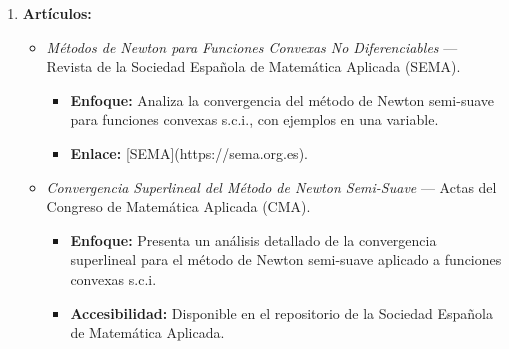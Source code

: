 \documentclass[12pt]{book}
\theoremstyle{definition}
\theoremstyle{plain}
\theoremstyle{remark}
\begin{document}
\begin{enumerate}
\begin{itemize}
        \item \textit{Curso de Optimización Convexa y No Diferenciable} — Universidad Nacional Autónoma de México (UNAM).
          \begin{itemize}
            \item \textbf{Contenido:} Aborda el método de Newton semi-suave para subdiferenciales, con ejemplos en \( \mathbb{R} \) y análisis de convergencia.
            \item \textbf{Enlace:} [IMUNAM - Optimización](https://www.matem.unam.mx).
          \end{itemize}

        \item \textit{Notas de Clase: Métodos de Optimización} — Universidad de Sevilla, Departamento de Matemática Aplicada.
          \begin{itemize}
            \item \textbf{Contenido:} Incluye ejemplos detallados del método de Newton semi-suave para funciones convexas s.c.i., con demostraciones de convergencia superlineal.
            \item \textbf{Accesibilidad:} Disponible en el repositorio institucional.
          \end{itemize}
      \end{itemize}

    \item \textbf{Artículos:}
      \begin{itemize}
        \item \textit{Métodos de Newton para Funciones Convexas No Diferenciables} — Revista de la Sociedad Española de Matemática Aplicada (SEMA).
          \begin{itemize}
            \item \textbf{Enfoque:} Analiza la convergencia del método de Newton semi-suave para funciones convexas s.c.i., con ejemplos en una variable.
            \item \textbf{Enlace:} [SEMA](https://sema.org.es).
          \end{itemize}

        \item \textit{Convergencia Superlineal del Método de Newton Semi-Suave} — Actas del Congreso de Matemática Aplicada (CMA).
          \begin{itemize}
            \item \textbf{Enfoque:} Presenta un análisis detallado de la convergencia superlineal para el método de Newton semi-suave aplicado a funciones convexas s.c.i.
            \item \textbf{Accesibilidad:} Disponible en el repositorio de la Sociedad Española de Matemática Aplicada.
          \end{itemize}
      \end{itemize}


\end{enumerate}
\end{document}
